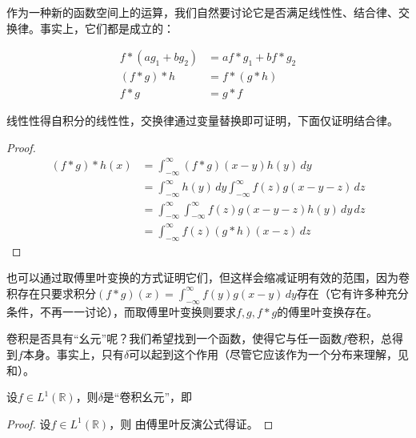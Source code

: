 作为一种新的函数空间上的运算，我们自然要讨论它是否满足线性性、结合律、交换律。事实上，它们都是成立的：
\begin{proposition}
    \label{prop:conv_prop}
    \begin{align*}
        f*(ag_1+bg_2) & =af*g_1+bf*g_2 \\
        (f*g)*h       & =f*(g*h)       \\
        f*g           & =g*f
    \end{align*}
\end{proposition}
线性性得自积分的线性性，交换律通过变量替换即可证明，下面仅证明结合律。
\begin{proof}
    \begin{align*}
        (f*g)*h(x) & =\int_{-\infty}^{\infty}(f*g)(x-y)h(y)\,dy                              \\
                   & =\int_{-\infty}^{\infty}h(y)\,dy\int_{-\infty}^{\infty}f(z)g(x-y-z)\,dz \\
                   & =\int_{-\infty}^{\infty}\int_{-\infty}^{\infty}f(z)g(x-y-z)h(y)\,dy\,dz \\
                   & =\int_{-\infty}^{\infty}f(z)(g*h)(x-z)\,dz
    \end{align*}
\end{proof}

也可以通过取傅里叶变换的方式证明它们，但这样会缩减证明有效的范围，因为卷积存在只要求积分$(f*g)(x)=\int_{-\infty}^{\infty}f(y)g(x-y)\,dy$存在（它有许多种充分条件，不再一一讨论），而取傅里叶变换则要求$f,g,f*g$的傅里叶变换存在。

卷积是否具有“幺元”呢？我们希望找到一个函数，使得它与任一函数$f$卷积，总得到$f$本身。事实上，只有$\delta$可以起到这个作用（尽管它应该作为一个分布来理解，见和）。
\begin{proposition}[卷积幺元]
    设$f\in L^1(\mathbb{R})$，则$\delta$是“卷积幺元”，即
\end{proposition}
\begin{proof}
    设$f\in L^1(\mathbb{R})$，则
    由傅里叶反演公式得证。
\end{proof}

